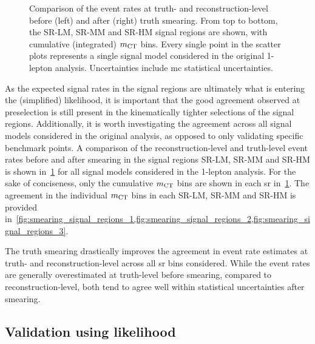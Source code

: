 \begin{figure}
\begin{subfigure}[b]{0.49\linewidth}
	\end{subfigure}
	\caption{Comparison of the event rates at truth- and reconstruction-level before (left) and after (right) truth smearing. From top to bottom, the SR-LM, SR-MM and SR-HM signal regions are shown, with cumulative (integrated) $m_{\textrm{CT}}$ bins. Every single point in the scatter plots represents a single signal model considered in the original 1-lepton analysis. Uncertainties include \gls{mc} statistical uncertainties.}
	\label{fig:smearing_signal_regions}
\end{figure}
 
 As the expected signal rates in the signal regions are ultimately what is entering the (simplified) likelihood, it is important that the good agreement observed at preselection is still present in the kinematically tighter selections of the signal regions. Additionally, it is worth investigating the agreement across all signal models considered in the original analysis, as opposed to only validating specific benchmark points. A comparison of the reconstruction-level and truth-level event rates before and after smearing in the signal regions SR-LM, SR-MM and SR-HM is shown in~\cref{fig:smearing_signal_regions} for all signal models considered in the 1-lepton analysis. For the sake of conciseness, only the cumulative $m_{\textrm{CT}}$ bins are shown in each \gls{sr} in~\cref{fig:smearing_signal_regions}. The agreement in the individual $m_{\textrm{CT}}$ bins in each SR-LM, SR-MM and SR-HM is provided in~\cref{fig:smearing_signal_regions_1,fig:smearing_signal_regions_2,fig:smearing_signal_regions_3}.
 
The truth smearing drastically improves the agreement in event rate estimates at truth- and reconstruction-level across all \gls{sr} bins considered. While the event rates are generally overestimated at truth-level before smearing, compared to reconstruction-level, both tend to agree well within statistical uncertainties after smearing. 
 
\subsection{Validation using likelihood}


